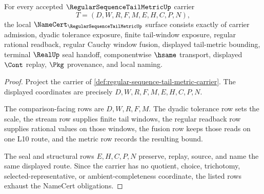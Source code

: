 \begin{theorem}\label{thm:regular-sequence-tail-metric-namecert-obligations}
For every accepted $\RegularSequenceTailMetricUp$ carrier
$$
T=(D,W,R,F,M,E,H,C,P,N),
$$
the local $\NameCert_{\RegularSequenceTailMetricUp}$ surface consists exactly of carrier admission, dyadic tolerance exposure, finite tail-window exposure, regular rational readback, regular Cauchy window fusion, displayed tail-metric bounding, terminal $\RealUp$ seal handoff, componentwise $\hsame$ transport, displayed $\Cont$ replay, $\Pkg$ provenance, and local naming.
\end{theorem}
\begin{proof}
Project the carrier of \autoref{def:regular-sequence-tail-metric-carrier}. The displayed coordinates are precisely $D,W,R,F,M,E,H,C,P,N$.

The comparison-facing rows are $D,W,R,F,M$. The dyadic tolerance row sets the scale, the stream row supplies finite tail windows, the regular readback row supplies rational values on those windows, the fusion row keeps those reads on one L10 route, and the metric row records the resulting bound.

The seal and structural rows $E,H,C,P,N$ preserve, replay, source, and name the same displayed route. Since the carrier has no quotient, choice, trichotomy, selected-representative, or ambient-completeness coordinate, the listed rows exhaust the NameCert obligations.
\end{proof}

